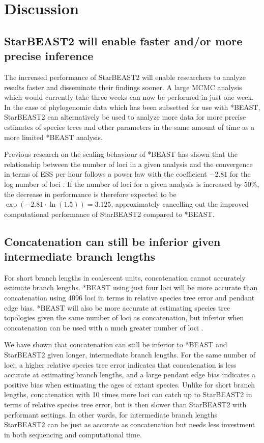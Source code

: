 \documentclass[12pt]{article}
\begin{document}
\clearpage

\section*{Discussion}

\subsection*{StarBEAST2 will enable faster and/or more precise inference}

The increased performance of StarBEAST2 will enable researchers to analyze
results faster and disseminate their findings sooner. A large MCMC analysis
which would currently take three weeks can now be performed in just one week. In
the case of phylogenomic data which has been subsetted for use with *BEAST,
StarBEAST2 can alternatively be used to analyze more data for more precise
estimates of species trees and other parameters in the same amount of time as a
more limited *BEAST analysis.

Previous research on the scaling behaviour of *BEAST has shown that the
relationship between the number of loci in a given analysis and the convergence
in terms of ESS per hour follows a power law with the coefficient $-2.81$ for
the log number of loci \citep{Ogilvie01052016}. If the number of loci for a
given analysis is increased by 50\%, the decrease in performance is therefore
expected to be $\exp(-2.81 \cdot \ln(1.5)) = 3.125$, approximately cancelling
out the improved computational performance of StarBEAST2 compared to *BEAST.

\subsection*{Concatenation can still be inferior given intermediate branch lengths}

For short branch lengths in coalescent units, concatenation cannot accurately
estimate branch lengths. *BEAST using just four loci will be more accurate than
concatenation using 4096 loci in terms in relative species tree error and
pendant edge bias. *BEAST will also be more accurate at estimating species tree
topologies given the same number of loci as concatenation, but inferior when
concatenation can be used with a much greater number of loci
\citep{Ogilvie01052016}.

We have shown that concatenation can still be inferior to *BEAST and StarBEAST2
given longer, intermediate branch lengths. For the same number of loci, a higher
relative species tree error indicates that concatenation is less accurate at
estimating branch lengths, and a large pendant edge bias indicates a positive
bias when estimating the ages of extant species. Unlike for short branch
lengths, concatenation with 10 times more loci can catch up to StarBEAST2 in
terms of relative species tree error, but is then slower than StarBEAST2 with
performant settings. In other words, for intermediate branch lengths StarBEAST2
can be just as accurate as concatenation but needs less investment in both
sequencing and computational time.
\end{document}
